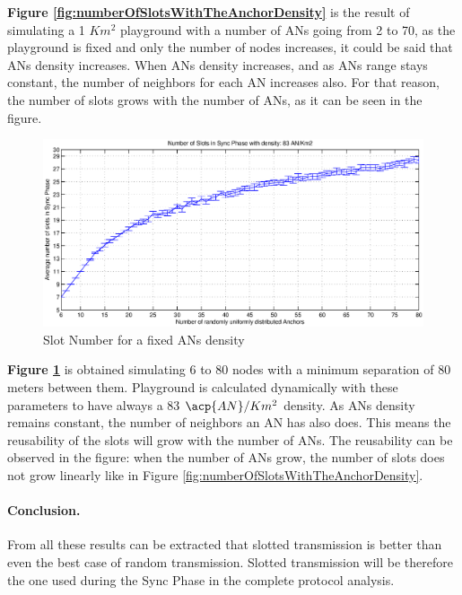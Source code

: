 \textbf{Figure \ref{fig:numberOfSlotsWithTheAnchorDensity}} is the result of simulating a 1 $Km^2$ playground with a number of \acp{AN} going from 
2 to 70, as the playground is fixed and only the number of nodes increases, it could be said that \acp{AN} density increases. When \acp{AN} density 
increases, and as \acp{AN} range stays constant, the number of neighbors for each \ac{AN} increases also. For that reason, the number of slots grows 
with the number of \acp{AN}, as it can be seen in the figure.

\begin{figure}[ht]
 \begin{center}
  \includegraphics[width=1\textwidth]{numberOfSlotsWithTheSameDensity.eps}
 \end{center}
 \caption{Slot Number for a fixed \acp{AN} density}
 \label{fig:numberOfSlotsWithTheSameDensity}
\end{figure}

\textbf{Figure \ref{fig:numberOfSlotsWithTheSameDensity}} is obtained simulating 6 to 80 nodes with a minimum separation of 80 meters between 
them. Playground is calculated dynamically with these parameters to have always a 83 $\acp{AN}/Km^2$ density. As \acp{AN} density remains constant,
the number of neighbors an \ac{AN} has also does. This means the reusability of the slots will grow with the number of \acp{AN}. The reusability can be
observed in the figure: when the number of \acp{AN} grow, the number of slots does not grow linearly like in Figure \ref{fig:numberOfSlotsWithTheAnchorDensity}.

\paragraph{Conclusion.} From all these results can be extracted that slotted transmission is better than even the best case of random transmission. 
Slotted transmission will be therefore the one used during the Sync Phase in the complete protocol analysis.

